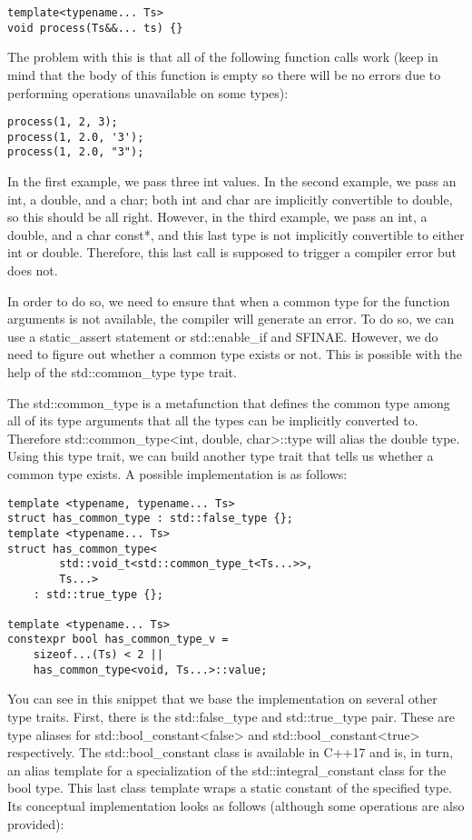 \begin{lstlisting}[style=styleCXX]
template<typename... Ts>
void process(Ts&&... ts) {}
\end{lstlisting}

The problem with this is that all of the following function calls work (keep in mind that the body of this function is empty so there will be no errors due to performing operations unavailable on some types):

\begin{lstlisting}[style=styleCXX]
process(1, 2, 3);
process(1, 2.0, '3');
process(1, 2.0, "3");
\end{lstlisting}

In the first example, we pass three int values. In the second example, we pass an int, a double, and a char; both int and char are implicitly convertible to double, so this should be all right. However, in the third example, we pass an int, a double, and a char const*, and this last type is not implicitly convertible to either int or double. Therefore, this last call is supposed to trigger a compiler error but does not.

In order to do so, we need to ensure that when a common type for the function arguments is not available, the compiler will generate an error. To do so, we can use a static\_assert statement or std::enable\_if and SFINAE. However, we do need to figure out whether a common type exists or not. This is possible with the help of the std::common\_type type trait.

The std::common\_type is a metafunction that defines the common type among all of its type arguments that all the types can be implicitly converted to. Therefore std::common\_type<int, double, char>::type will alias the double type. Using this type trait, we can build another type trait that tells us whether a common type exists. A possible implementation is as follows:

\begin{lstlisting}[style=styleCXX]
template <typename, typename... Ts>
struct has_common_type : std::false_type {};
template <typename... Ts>
struct has_common_type<
		std::void_t<std::common_type_t<Ts...>>,
		Ts...>
	: std::true_type {};
	
template <typename... Ts>
constexpr bool has_common_type_v =
	sizeof...(Ts) < 2 ||
	has_common_type<void, Ts...>::value;
\end{lstlisting}

You can see in this snippet that we base the implementation on several other type traits. First, there is the std::false\_type and std::true\_type pair. These are type aliases for std::bool\_constant<false> and std::bool\_constant<true> respectively. The std::bool\_constant class is available in C++17 and is, in turn, an alias template for a specialization of the std::integral\_constant class for the bool type. This last class template wraps a static constant of the specified type. Its conceptual implementation looks as follows (although some operations are also provided):

